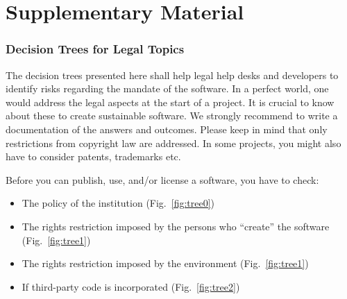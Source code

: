 \documentclass[a4paper,num-refs,numbers,sort&compress]{de-rse}
\begin{document}







%


\clearpage

\renewcommand{\thefigure}{S\arabic{figure}}
\setcounter{figure}{0}  
\section{Supplementary Material}
\subsubsection{Decision Trees for Legal Topics}
The decision trees presented here shall help legal help desks and developers to identify risks regarding the mandate of the software. In a perfect world, one would address the legal aspects at the start of a project. It is crucial to know about these to create sustainable software. We strongly recommend to write a documentation of the answers and outcomes. Please keep in mind that only restrictions from copyright law are addressed. In some projects, you might also have to consider patents, trademarks etc.

Before you can publish, use, and/or license a software, you have to check:
\begin{itemize}
    \item The policy of the institution (Fig.~\ref{fig:tree0})
    \item The rights restriction imposed by the persons who ``create'' the software (Fig.~\ref{fig:tree1})
    \item The rights restriction imposed by the environment (Fig.~\ref{fig:tree1})
    \item If third-party code is incorporated (Fig.~\ref{fig:tree2})
\end{itemize}
\end{document}
